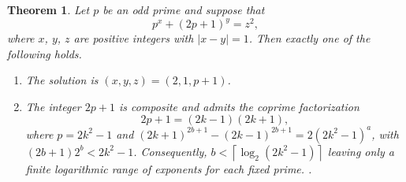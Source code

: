 \documentclass[reqno,12pt]{amsart}
\newtheorem{theorem}{Theorem}[section]
\theoremstyle{definition}
\begin{document}
\begin{theorem}\label{T3.1}
\normalfont Let $p$ be an odd prime and suppose that
\begin{equation*}
	p^x + \left ( 2p +1 \right)^y = z^2,
\end{equation*}
where $x$, $y$, $z$ are positive integers with $|x-y|=1$. Then exactly one of the following holds.
\begin{enumerate}
	\item[(i)] The solution is $(x, y, z) = (2, 1, p + 1)$.
	\item[(ii)] The integer $2p + 1$ is composite and admits the coprime factorization 
	\begin{equation*}
		2p + 1 = (2k - 1)(2k + 1),
	\end{equation*}
	where $p=2k^2-1$ and $(2k + 1)^{2b+1} - (2k - 1)^{2b+1} = 2(2k^2 - 1)^a$, with $(2b+1)2^b<2k^2-1$. 
	Consequently, $ b< \left\lceil \log_2(2k^2-1) \right\rceil$ leaving only a finite logarithmic range of exponents for each fixed prime. .
\end{enumerate}

\end{theorem}
\end{document}

